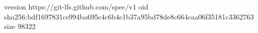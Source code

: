 version https://git-lfs.github.com/spec/v1
oid sha256:bdf1697831ce994ba695c4c6b4e1b37a95bd78de8c664caa06f35181c3362763
size 98322
